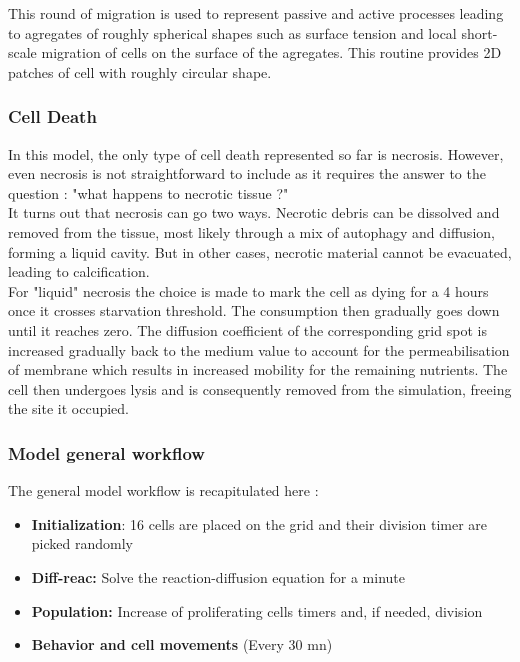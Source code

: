 \documentclass[11pt,a4paper]{article}
\begin{document}
This round of migration is used to represent passive and active processes leading to agregates of roughly spherical shapes such as surface tension and local short-scale migration of cells on the surface of the agregates. This routine provides 2D patches of cell with roughly circular shape.\\


\subsubsection{Cell Death}
In this model, the only type of cell death represented so far is necrosis. However, even necrosis is not straightforward to include as it requires the answer to the question : "what happens to necrotic tissue ?"\\

It turns out that necrosis can go two ways. Necrotic debris can be dissolved and removed from the tissue, most likely through a mix of autophagy and diffusion, forming a liquid cavity. But in other cases, necrotic material cannot be evacuated, leading to calcification.\cite{Thim2010}\cite{YuMi2017}\\

For "liquid" necrosis the choice is made to mark the cell as dying for a 4 hours once it crosses starvation threshold. The consumption then gradually goes down until it reaches zero. The diffusion coefficient of the corresponding grid spot is increased gradually back to the medium value to account for the permeabilisation of membrane which results in increased mobility for the remaining nutrients. The cell then undergoes lysis and is consequently removed from the simulation, freeing the site it occupied.\\

\subsubsection{Model general workflow}
The general model workflow is recapitulated here :
\begin{itemize}
\item \textbf{Initialization}: 16 cells are placed on the grid and their division timer are picked randomly
\item \textbf{Diff-reac:} Solve the reaction-diffusion equation for a minute
\item \textbf{Population:} Increase of proliferating cells timers and, if needed, division
\item \textbf{Behavior and cell movements} (Every 30 mn) 
\end{itemize}
\end{document}
